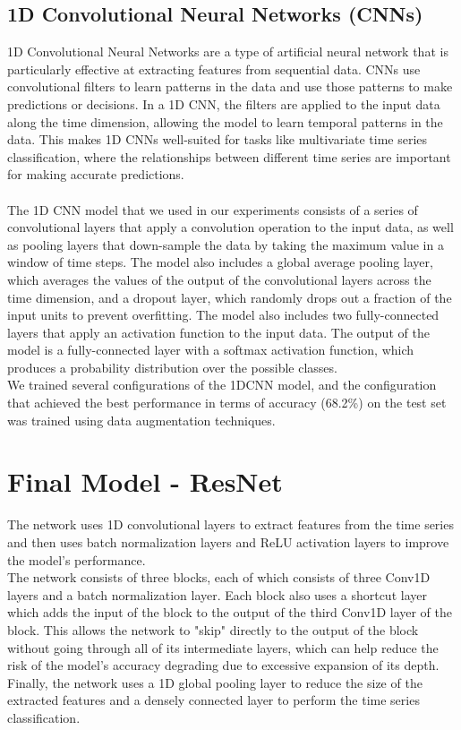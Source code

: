 \documentclass[11pt, oneside]{article}
\begin{document}
\subsection{1D Convolutional Neural Networks (CNNs)}
1D Convolutional Neural Networks are a type of artificial neural network that is particularly effective at extracting features from sequential data. CNNs use convolutional filters to learn patterns in the data and use those patterns to make predictions or decisions. In a 1D CNN, the filters are applied to the input data along the time dimension, allowing the model to learn temporal patterns in the data. This makes 1D CNNs well-suited for tasks like multivariate time series classification, where the relationships between different time series are important for making accurate predictions.\\\\
The 1D CNN model that we used in our experiments consists of a series of convolutional layers that apply a convolution operation to the input data, as well as pooling layers that down-sample the data by taking the maximum value in a window of time steps. The model also includes a global average pooling layer, which averages the values of the output of the convolutional layers across the time dimension, and a dropout layer, which randomly drops out a fraction of the input units to prevent overfitting. The model also includes two fully-connected layers that apply an activation function to the input data. The output of the model is a fully-connected layer with a softmax activation function, which produces a probability distribution over the possible classes.
\\
We trained several configurations of the 1DCNN model, and the configuration that achieved the best performance in terms of accuracy (68.2\%) on the test set was trained using data augmentation techniques.
\section{Final Model - ResNet}
The network uses 1D convolutional layers to extract features from the time series and then uses batch normalization layers and ReLU activation layers to improve the model's performance.\\
The network consists of three blocks, each of which consists of three Conv1D layers and a batch normalization layer. Each block also uses a shortcut layer which adds the input of the block to the output of the third Conv1D layer of the block. This allows the network to "skip" directly to the output of the block without going through all of its intermediate layers, which can help reduce the risk of the model's accuracy degrading due to excessive expansion of its depth.\\
Finally, the network uses a 1D global pooling layer to reduce the size of the extracted features and a densely connected layer to perform the time series classification.
\end{document}
